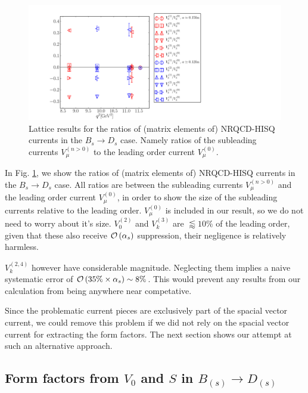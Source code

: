 \begin{figure}[htb!]
  \begin{center}
    \includegraphics[width=1.2\textwidth]{images/nrqcd/BsDs_currentratios.pdf}
  \end{center}
  \caption{Lattice results for the ratios of (matrix elements of) NRQCD-HISQ currents in the $B_s\to D_s$ case. Namely ratios of the subleading currents $V_{\mu}^{(n>0)}$ to the leading order current $V_{\mu}^{(0)}$. \label{eq:currentratios}}
\end{figure}

In Fig. \ref{eq:currentratios}, we show the ratios of (matrix elements of) NRQCD-HISQ currents in the $B_s\to D_s$ case. All ratios are between the subleading currents $V_{\mu}^{(n>0)}$ and the leading order current $V_{\mu}^{(0)}$, in order to show the size of the subleading currents relative to the leading order. $V^{(0)}_{\mu}$ is included in our result, so we do not need to worry about it's size. $V_0^{(2)}$ and $V_k^{(3)}$ are $\lessapprox 10\%$ of the leading order, given that these also receive $\mathcal{O}\left( \alpha_s \right)$ suppression, their negligence is relatively harmless.

$V_k^{(2,4)}$ however have considerable magnitude. Neglecting them implies a naive systematic error of $\mathcal{O}\left(  35\% \times \alpha_s  \right) \sim 8\%$. This would prevent any results from our calculation from being anywhere near competative.

Since the problematic current pieces are exclusively part of the spacial vector current, we could remove this problem if we did not rely on the spacial vector current for extracting the form factors. The next section shows our attempt at such an alternative approach.

\subsection{Form factors from $V_0$ and $S$ in $B_{(s)}\to D_{(s)}$}
\label{sec:fplus_divergence}

